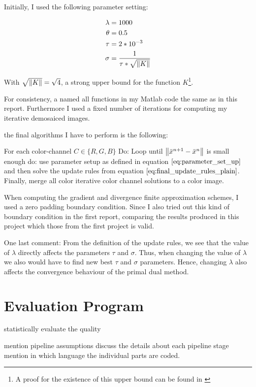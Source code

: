 Initially, I used the following parameter setting:

\begin{align}
	\lambda &= 1000 \\
	\theta &= 0.5 \\
	\tau &= 2*10^{-3} \\
	\sigma &= \frac{1}{\tau * \sqrt{\left\lVert K\right\rVert}}
\label{eq:parameter_set_up}	
\end{align}

With $\sqrt{\left\lVert K\right\rVert} = \sqrt{4}$, a strong upper bound for the function $K$\footnote{A proof for the existence of this upper bound can be found in \cite{chambolle2004algorithm}}.

For consistency, a named all functions in my Matlab code the same as in this report. Furthermore I used a fixed number of iterations for computing my iterative demosaiced images.

the final algorithms I have to perform is the following:

For each color-channel $C \in \{R,G,B\}$ Do: Loop until $\left\lVert\bar{x}^{n+1} - \bar{x}^{n}\right\rVert$ is small enough do: use parameter setup as defined in equation $\ref{eq:parameter_set_up}$ and then solve the update rules from equation $\ref{eq:final_update_rules_plain}$. Finally, merge all color iterative color channel solutions to a color image.

When computing the gradient and divergence finite approximation schemes, I used a zero padding boundary condition. Since I also tried out this kind of boundary condition in the first report, comparing the results produced in this project which those from the first project is valid.

One last comment: From the definition of the update rules, we see that the value of $\lambda$ directly affects the parameters $\tau$ and $\sigma$. Thus, when changing the value of $\lambda$ we also would have to find new best $\tau$ and $\sigma$ parameters. Hence, changing $\lambda$ also affects the convergence behaviour of the primal dual method. 

\section{Evaluation Program}
statistically evaluate the quality






mention pipeline assumptions
discuss the details about each pipeline stage
mention in which language the individual parts are coded.
